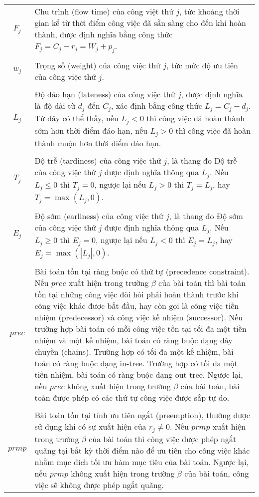 \documentclass[12pt,a4paper]{report}
\begin{document}
\begin{tabularx}{\linewidth}{ c  X }
		\\
		$F_j$ & Chu trình (flow time) của công việt thứ $j$, tức khoảng thời gian kể từ thời điểm công việc đã sẵn sàng cho đến khi hoàn thành, được định nghĩa bằng công thức $F_j = C_j - r_j = W_j + p_j$. \\
		\\
		$w_j$ & Trọng số (weight) của công việc thứ $j$, tức mức độ ưu tiên của công việc thứ $j$. \\
		\\
		$L_j$ & Độ đáo hạn (lateness) của công việc thứ $j$, được định nghĩa là độ dài từ $d_j$ đến $C_j$, xác định bằng công thức $L_j=C_j-d_j$. Từ đây có thể thấy, nếu $L_j < 0$ thì công việc đã hoàn thành sớm hơn thời điểm đáo hạn, nếu $L_j > 0$ thì công việc đã hoàn thành muộn hơn thời điểm đáo hạn. \\
		\\
		$T_j$ & Độ trễ (tardiness) của công việc thứ $j$, là thang đo Độ trễ của công việc thứ $j$ được định nghĩa thông qua $L_j$. Nếu $L_j \leq 0$ thì $T_j=0$, ngược lại nếu $L_j > 0$ thì $T_j = L_j$, hay $T_j=\max (L_j,0)$. \\
		\\
		$E_j$ & Độ sớm (earliness) của công việc thứ $j$, là thang đo Độ sớm của công việc thứ $j$ được định nghĩa thông qua $L_j$. Nếu $L_j \geq 0$ thì $E_j=0$, ngược lại nếu $L_j < 0$ thì $E_j = L_j$, hay $E_j=\max (|L_j|,0)$. \\
		\\
		$prec$ & Bài toán tồn tại ràng buộc có thứ tự (precedence constraint). Nếu $prec$ xuất hiện trong trường $\beta$ của bài toán thì bài toán tồn tại những công việc đòi hỏi phải hoàn thành trước khi công việc khác được bắt đầu, hay còn gọi là công việc tiền nhiệm (predecessor) và công việc kế nhiệm (successor). Nếu trường hợp bài toán có mỗi công việc tồn tại tối đa một tiền nhiệm và một kế nhiệm, bài toán có ràng buộc dạng dây chuyền (chains). Trường hợp có tối đa một kế nhiệm, bài toán có ràng buộc dạng in-tree. Trường hợp có tối đa một tiền nhiệm, bài toán có ràng buộc dạng out-tree. Ngược lại, nếu $prec$ không xuất hiện trong trường $\beta$ của bài toán, bài toàn được phép có các thứ tự công việc được sắp tự do. \\
		\\
		$prmp$ & Bài toán tồn tại tính ưu tiên ngắt (preemption), thường được sử dụng khi có sự xuất hiện của $r_j \neq 0$. Nếu $prmp$ xuất hiện trong trường $\beta$ của bài toán thì công việc được phép ngắt quãng tại bất kỳ thời điểm nào để ưu tiên cho công việc khác nhằm mục đích tối ưu hàm mục tiêu của bài toán. Ngược lại, nếu $prmp$ không xuất hiện trong trường $\beta$ của bài toán, công việc sẽ không được phép ngắt quãng. \\
	\end{tabularx}
\newpage
{} 
\end{document}
